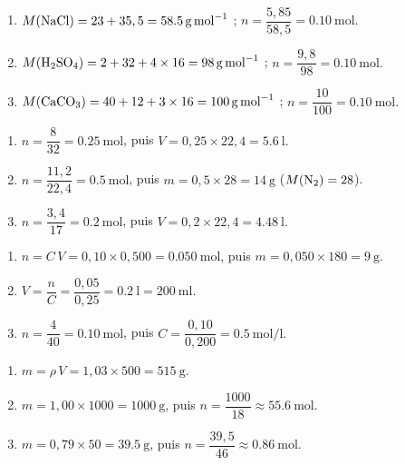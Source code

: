 \documentclass[11pt,a4paper]{article}
\begin{document}
\begin{corrige}
\begin{enumerate}[label=\alph*)]
  \item $M(\ce{NaCl})=23+35,5=\qty{58.5}{\gram\per\mole}$ ; $n=\dfrac{5,85}{58,5}=\qty{0.10}{\mole}.$
  \item $M(\ce{H2SO4})=2+32+4\times16=\qty{98}{\gram\per\mole}$ ; $n=\dfrac{9,8}{98}=\qty{0.10}{\mole}.$
  \item $M(\ce{CaCO3})=40+12+3\times16=\qty{100}{\gram\per\mole}$ ; $n=\dfrac{10}{100}=\qty{0.10}{\mole}.$
\end{enumerate}
\end{corrige}

\begin{corrige}
\begin{enumerate}[label=\alph*)]
  \item $n=\dfrac{8}{32}=\qty{0.25}{\mole}$, puis $V=0,25\times22,4=\qty{5.6}{\litre}.$
  \item $n=\dfrac{11,2}{22,4}=\qty{0.5}{\mole}$, puis $m=0,5\times28=\qty{14}{\gram}$ \;($M(\ce{N2})=28$).
  \item $n=\dfrac{3,4}{17}=\qty{0.2}{\mole}$, puis $V=0,2\times22,4=\qty{4.48}{\litre}.$
\end{enumerate}
\end{corrige}

\begin{corrige}
\begin{enumerate}[label=\alph*)]
  \item $n=C\,V=0,10\times0,500=\qty{0.050}{\mole}$, puis $m=0,050\times180=\qty{9}{\gram}.$
  \item $V=\dfrac{n}{C}=\dfrac{0,05}{0,25}=\qty{0.2}{\litre}=\qty{200}{\milli\litre}.$
  \item $n=\dfrac{4}{40}=\qty{0.10}{\mole}$, puis $C=\dfrac{0,10}{0,200}=\qty{0.5}{\mole\per\litre}.$
\end{enumerate}
\end{corrige}

\begin{corrige}
\begin{enumerate}[label=\alph*)]
  \item $m=\rho\,V=1,03\times500=\qty{515}{\gram}.$
  \item $m=1,00\times1000=\qty{1000}{\gram}$, puis $n=\dfrac{1000}{18}\approx\qty{55.6}{\mole}.$
  \item $m=0,79\times50=\qty{39.5}{\gram}$, puis $n=\dfrac{39,5}{46}\approx\qty{0.86}{\mole}.$
\end{enumerate}
\end{corrige}
\end{document}
